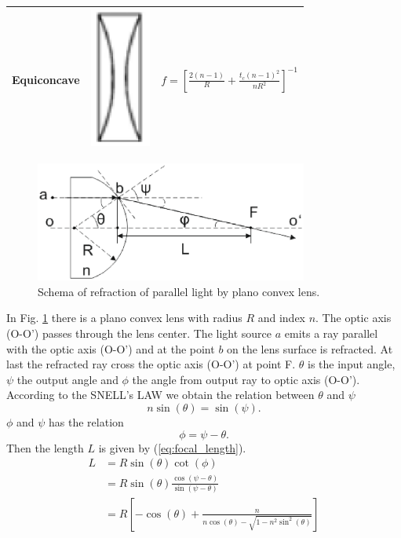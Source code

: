 \begin{table}[!ht]
\begin{tabular}{|c|c|c|}
\hline
Equiconcave & \parbox[c]{2.1cm}{\includegraphics[width=2cm]{bilder/equi_concave}} & $f=\left[\frac{2(n-1)}{R} + \frac{t_{c}(n-1)^2}{nR^2}\right]^{-1}$ \\
\hline
\end{tabular}
\label{tab:lenses_focal_length}
\end{table}
\begin{figure}[!ht]
\centering
\includegraphics[width=0.8\textwidth]{bilder/focal_length}
\caption{Schema of refraction of parallel light by plano convex lens.}
\label{fig:focal_length}
\end{figure}
In Fig. \ref{fig:focal_length} there is a plano convex lens with radius $R$ and index $n$. The optic axis (O-O') passes through the lens center.  The light source $a$ emits a ray parallel with the optic axis (O-O') and at the point $b$ on the lens surface is refracted. At last the refracted ray cross the optic axis (O-O') at point F. $\theta$ is the input angle, $\psi$ the output angle and $\phi$ the angle from output ray to optic axis (O-O'). According to the SNELL's LAW we obtain the relation between $\theta$ and $\psi$ 
\begin{equation*}
 n\sin(\theta)=\sin(\psi)\text{.}
\label{eq:snell_focal}
\end{equation*} 
$\phi$ and $\psi$ has the relation
\begin{equation*}
\phi=\psi-\theta \text{.}
\label{eq:psi_phi}
\end{equation*}
Then the length $L$ is given by (\ref{eq:focal_length}). 
\begin{align}
L&=R\sin(\theta)\cot(\phi) \nonumber\\
&=R\sin(\theta)\frac{\cos(\psi-\theta)}{\sin(\psi-\theta)} \nonumber\\
&=R \left[-\cos(\theta)+\frac{n}{n\cos(\theta)-\sqrt{1-n^{2}\sin^{2}(\theta)}} \right]
\label{eq:focal_length}
\end{align}
